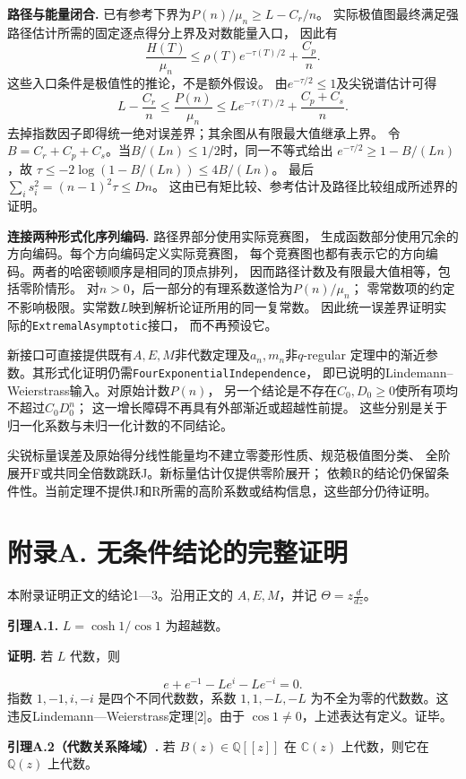 \documentclass[UTF8,11pt,fontset=fandol]{ctexart}
\begin{document}
\textbf{路径与能量闭合.} 已有参考下界为$P(n)/\mu_n\ge L-C_r/n$。
实际极值图最终满足强路径估计所需的固定逐点得分上界及对数能量入口，
因此有
\[
 \frac{H(T)}{\mu_n}\le\rho(T)e^{-\tau(T)/2}+\frac{C_p}{n}.
\]
这些入口条件是极值性的推论，不是额外假设。
由$e^{-\tau/2}\le1$及尖锐谱估计可得
\[
 L-\frac{C_r}{n}\le\frac{P(n)}{\mu_n}
 \le L e^{-\tau(T)/2}+\frac{C_p+C_s}{n}.
\]
去掉指数因子即得统一绝对误差界；其余图从有限最大值继承上界。
令$B=C_r+C_p+C_s$。当$B/(Ln)\le1/2$时，同一不等式给出
$e^{-\tau/2}\ge1-B/(Ln)$，故
$\tau\le-2\log(1-B/(Ln))\le4B/(Ln)$。
最后$\sum_i s_i^2=(n-1)^2\tau\le Dn$。
这由已有矩比较、参考估计及路径比较组成所述界的证明。

\textbf{连接两种形式化序列编码.} 路径界部分使用实际竞赛图，
生成函数部分使用冗余的方向编码。每个方向编码定义实际竞赛图，
每个竞赛图也都有表示它的方向编码。两者的哈密顿顺序是相同的顶点排列，
因而路径计数及有限最大值相等，包括零阶情形。
对$n>0$，后一部分的有理系数遂恰为$P(n)/\mu_n$；
零常数项的约定不影响极限。实常数$L$映到解析论证所用的同一复常数。
因此统一误差界证明实际的\texttt{ExtremalAsymptotic}接口，
而不再预设它。

新接口可直接提供既有$A,E,M$非代数定理及$a_n,m_n$非$q$-regular
定理中的渐近参数。其形式化证明仍需\texttt{FourExponentialIndependence}，
即已说明的Lindemann--Weierstrass输入。对原始计数$P(n)$，
另一个结论是不存在$C_0,D_0\ge0$使所有项均不超过$C_0D_0^n$；
这一增长障碍不再具有外部渐近或超越性前提。
这些分别是关于归一化系数与未归一化计数的不同结论。

尖锐标量误差及原始得分线性能量均不建立零菱形性质、规范极值图分类、
全阶展开F或共同全倍数跳跃J。新标量估计仅提供零阶展开；
依赖R的结论仍保留条件性。当前定理不提供J和R所需的高阶系数或结构信息，这些部分仍待证明。

\section*{附录A. 无条件结论的完整证明}
本附录证明正文的结论1—3。沿用正文的 $A,E,M$，并记 $\Theta=z\frac{d}{dz}$。

\textbf{引理A.1.} $L=\cosh1/\cos1$ 为超越数。

\textbf{证明.} 若 $L$ 代数，则

\[
e+e^{-1}-Le^i-Le^{-i}=0.
\]
指数 $1,-1,i,-i$ 是四个不同代数数，系数 $1,1,-L,-L$ 为不全为零的代数数。这违反Lindemann—Weierstrass定理[2]。由于 $\cos1\ne0$，上述表达有定义。证毕。

\textbf{引理A.2（代数关系降域）.} 若 $B(z)\in\mathbb Q[[z]]$ 在 $\mathbb C(z)$ 上代数，则它在 $\mathbb Q(z)$ 上代数。
\end{document}
